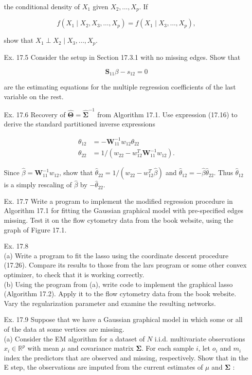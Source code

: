 \documentclass[10pt]{article}
\begin{document}
the conditional density of $X_{1}$ given $X_{2}, \ldots, X_{p}$. If

$$
f\left(X_{1} \mid X_{2}, X_{3}, \ldots, X_{p}\right)=f\left(X_{1} \mid X_{3}, \ldots, X_{p}\right),
$$

show that $X_{1} \perp X_{2} \mid X_{3}, \ldots, X_{p}$.

Ex. 17.5 Consider the setup in Section 17.3.1 with no missing edges. Show that

$$
\mathbf{S}_{11} \beta-s_{12}=0
$$

are the estimating equations for the multiple regression coefficients of the last variable on the rest.

Ex. 17.6 Recovery of $\hat{\boldsymbol{\Theta}}=\hat{\boldsymbol{\Sigma}}^{-1}$ from Algorithm 17.1. Use expression (17.16) to derive the standard partitioned inverse expressions


\begin{align*}
\theta_{12} & =-\mathbf{W}_{11}^{-1} w_{12} \theta_{22}  \tag{17.41}\\
\theta_{22} & =1 /\left(w_{22}-w_{12}^{T} \mathbf{W}_{11}^{-1} w_{12}\right) . \tag{17.42}
\end{align*}


Since $\hat{\beta}=\mathbf{W}_{11}^{-1} w_{12}$, show that $\hat{\theta}_{22}=1 /\left(w_{22}-w_{12}^{T} \hat{\beta}\right)$ and $\hat{\theta}_{12}=-\hat{\beta} \hat{\theta}_{22}$. Thus $\hat{\theta}_{12}$ is a simply rescaling of $\hat{\beta}$ by $-\hat{\theta}_{22}$.

Ex. 17.7 Write a program to implement the modified regression procedure in Algorithm 17.1 for fitting the Gaussian graphical model with pre-specified edges missing. Test it on the flow cytometry data from the book website, using the graph of Figure 17.1.

Ex. 17.8\\
(a) Write a program to fit the lasso using the coordinate descent procedure (17.26). Compare its results to those from the lars program or some other convex optimizer, to check that it is working correctly.\\
(b) Using the program from (a), write code to implement the graphical lasso (Algorithm 17.2). Apply it to the flow cytometry data from the book website. Vary the regularization parameter and examine the resulting networks.

Ex. 17.9 Suppose that we have a Gaussian graphical model in which some or all of the data at some vertices are missing.\\
(a) Consider the EM algorithm for a dataset of $N$ i.i.d. multivariate observations $x_{i} \in \mathbb{R}^{p}$ with mean $\mu$ and covariance matrix $\boldsymbol{\Sigma}$. For each sample $i$, let $o_{i}$ and $m_{i}$ index the predictors that are observed and missing, respectively. Show that in the E step, the observations are imputed from the current estimates of $\mu$ and $\boldsymbol{\Sigma}$ :
\end{document}
